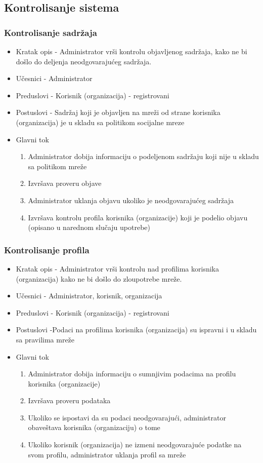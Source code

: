 \subsection{Kontrolisanje sistema}
\subsubsection{Kontrolisanje sadržaja}
\begin{itemize}
	\item Kratak opis - Administrator vrši kontrolu objavljenog sadržaja, kako ne bi došlo do deljenja neodgovarajućeg sadržaja. 
	\item Učesnici - Administrator
	\item Preduslovi - Korisnik (organizacija) - registrovani
	\item Postuslovi - Sadržaj koji je objavljen na mreži od strane korisnika (organizacija) je u skladu sa politikom socijalne mreze
	\item Glavni tok
	\begin{enumerate}
		\item Administrator dobija informaciju o podeljenom sadržaju koji nije u skladu sa politikom mreže
		\item Izvršava proveru objave
		\item Administrator uklanja objavu ukoliko je neodgovarajućeg sadržaja
		\item Izvršava kontrolu profila korisnika (organizacije) koji je podelio objavu (opisano u narednom slučaju upotrebe)
	\end{enumerate}
\end{itemize}


\subsubsection{Kontrolisanje profila}
\begin{itemize}
	\item Kratak opis - Administrator vrši kontrolu nad profilima korisnika (organizacija) kako ne bi došlo do zloupotrebe mreže. 
	\item Učesnici - Administrator, korisnik, organizacija
	\item Preduslovi - Korisnik (organizacija) - registrovani
	\item Postuslovi -Podaci na profilima korisnika (organizacija) su ispravni i u skladu sa pravilima mreže
	\item Glavni tok
	\begin{enumerate}
		\item Administrator dobija informaciju o sumnjivim podacima na profilu korisnika (organizacije)
		\item Izvršava proveru podataka
		\item Ukoliko se ispostavi da su podaci neodgovarajući, administrator obaveštava korisnika (organizaciju) o tome
		\item Ukoliko korisnik (organizacija) ne izmeni neodgovarajuće podatke na svom profilu, administrator uklanja profil sa mreže
	\end{enumerate}
\end{itemize}


